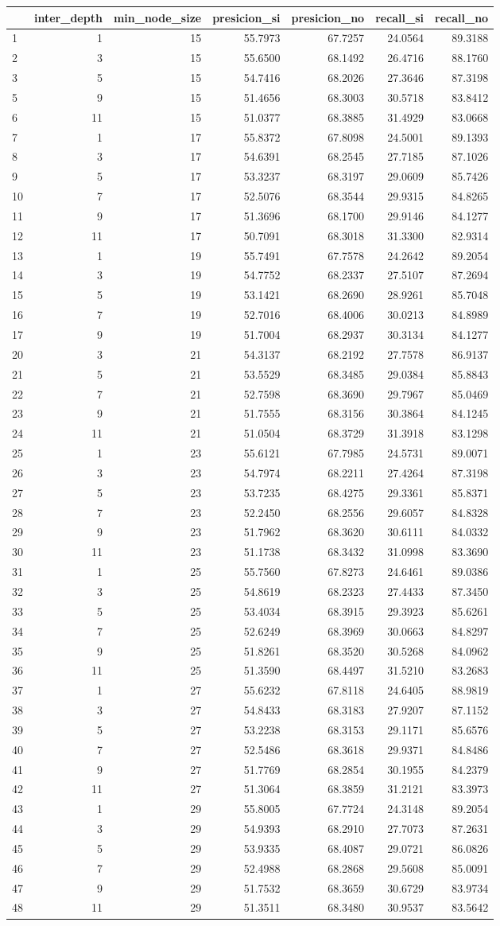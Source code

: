 \documentclass[]{article}
\begin{document}
\begin{longtable}[]{@{}lrrrrrr@{}}
\toprule
& inter\_depth & min\_node\_size & presicion\_si & presicion\_no &
recall\_si & recall\_no\tabularnewline
\midrule
\endhead
1 & 1 & 15 & 55.7973 & 67.7257 & 24.0564 & 89.3188\tabularnewline
2 & 3 & 15 & 55.6500 & 68.1492 & 26.4716 & 88.1760\tabularnewline
3 & 5 & 15 & 54.7416 & 68.2026 & 27.3646 & 87.3198\tabularnewline
5 & 9 & 15 & 51.4656 & 68.3003 & 30.5718 & 83.8412\tabularnewline
6 & 11 & 15 & 51.0377 & 68.3885 & 31.4929 & 83.0668\tabularnewline
7 & 1 & 17 & 55.8372 & 67.8098 & 24.5001 & 89.1393\tabularnewline
8 & 3 & 17 & 54.6391 & 68.2545 & 27.7185 & 87.1026\tabularnewline
9 & 5 & 17 & 53.3237 & 68.3197 & 29.0609 & 85.7426\tabularnewline
10 & 7 & 17 & 52.5076 & 68.3544 & 29.9315 & 84.8265\tabularnewline
11 & 9 & 17 & 51.3696 & 68.1700 & 29.9146 & 84.1277\tabularnewline
12 & 11 & 17 & 50.7091 & 68.3018 & 31.3300 & 82.9314\tabularnewline
13 & 1 & 19 & 55.7491 & 67.7578 & 24.2642 & 89.2054\tabularnewline
14 & 3 & 19 & 54.7752 & 68.2337 & 27.5107 & 87.2694\tabularnewline
15 & 5 & 19 & 53.1421 & 68.2690 & 28.9261 & 85.7048\tabularnewline
16 & 7 & 19 & 52.7016 & 68.4006 & 30.0213 & 84.8989\tabularnewline
17 & 9 & 19 & 51.7004 & 68.2937 & 30.3134 & 84.1277\tabularnewline
20 & 3 & 21 & 54.3137 & 68.2192 & 27.7578 & 86.9137\tabularnewline
21 & 5 & 21 & 53.5529 & 68.3485 & 29.0384 & 85.8843\tabularnewline
22 & 7 & 21 & 52.7598 & 68.3690 & 29.7967 & 85.0469\tabularnewline
23 & 9 & 21 & 51.7555 & 68.3156 & 30.3864 & 84.1245\tabularnewline
24 & 11 & 21 & 51.0504 & 68.3729 & 31.3918 & 83.1298\tabularnewline
25 & 1 & 23 & 55.6121 & 67.7985 & 24.5731 & 89.0071\tabularnewline
26 & 3 & 23 & 54.7974 & 68.2211 & 27.4264 & 87.3198\tabularnewline
27 & 5 & 23 & 53.7235 & 68.4275 & 29.3361 & 85.8371\tabularnewline
28 & 7 & 23 & 52.2450 & 68.2556 & 29.6057 & 84.8328\tabularnewline
29 & 9 & 23 & 51.7962 & 68.3620 & 30.6111 & 84.0332\tabularnewline
30 & 11 & 23 & 51.1738 & 68.3432 & 31.0998 & 83.3690\tabularnewline
31 & 1 & 25 & 55.7560 & 67.8273 & 24.6461 & 89.0386\tabularnewline
32 & 3 & 25 & 54.8619 & 68.2323 & 27.4433 & 87.3450\tabularnewline
33 & 5 & 25 & 53.4034 & 68.3915 & 29.3923 & 85.6261\tabularnewline
34 & 7 & 25 & 52.6249 & 68.3969 & 30.0663 & 84.8297\tabularnewline
35 & 9 & 25 & 51.8261 & 68.3520 & 30.5268 & 84.0962\tabularnewline
36 & 11 & 25 & 51.3590 & 68.4497 & 31.5210 & 83.2683\tabularnewline
37 & 1 & 27 & 55.6232 & 67.8118 & 24.6405 & 88.9819\tabularnewline
38 & 3 & 27 & 54.8433 & 68.3183 & 27.9207 & 87.1152\tabularnewline
39 & 5 & 27 & 53.2238 & 68.3153 & 29.1171 & 85.6576\tabularnewline
40 & 7 & 27 & 52.5486 & 68.3618 & 29.9371 & 84.8486\tabularnewline
41 & 9 & 27 & 51.7769 & 68.2854 & 30.1955 & 84.2379\tabularnewline
42 & 11 & 27 & 51.3064 & 68.3859 & 31.2121 & 83.3973\tabularnewline
43 & 1 & 29 & 55.8005 & 67.7724 & 24.3148 & 89.2054\tabularnewline
44 & 3 & 29 & 54.9393 & 68.2910 & 27.7073 & 87.2631\tabularnewline
45 & 5 & 29 & 53.9335 & 68.4087 & 29.0721 & 86.0826\tabularnewline
46 & 7 & 29 & 52.4988 & 68.2868 & 29.5608 & 85.0091\tabularnewline
47 & 9 & 29 & 51.7532 & 68.3659 & 30.6729 & 83.9734\tabularnewline
48 & 11 & 29 & 51.3511 & 68.3480 & 30.9537 & 83.5642\tabularnewline
\bottomrule
\end{longtable}
\end{document}

